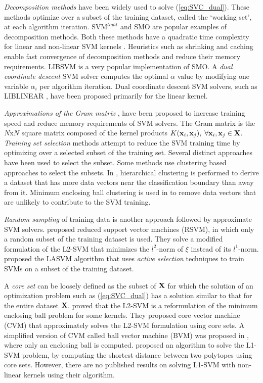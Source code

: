 \documentclass[twoside]{article}
\begin{document}
{\em Decomposition methods} \citep{Osuna97} have been widely used to solve (\ref{eq:SVC_dual}). These methods optimize over a subset of the training dataset, called the `working set', at each algorithm iteration. $\text{SVM}^{light}$ \citep{Joachims99} and SMO \citep{Platt99} are popular examples of decomposition methods. Both these methods have a quadratic time complexity for linear and non-linear SVM kernels \citep{Shalev08}. Heuristics such as shrinking and caching \citep{Joachims99} enable fast convergence of decomposition methods and reduce their memory requirements. LIBSVM \citep{LIBSVM} is a very popular implementation of SMO. A {\em dual coordinate descent} \citep{Hsieh08} SVM solver computes the optimal $\alpha$ value by modifying one variable $\alpha_i$ per algorithm iteration. Dual coordinate descent SVM solvers, such as LIBLINEAR \citep{Fan08}, have been proposed primarily for the linear kernel.

{\em Approximations of the Gram matrix} \citep{Fine02,Drineas05}, have been proposed to increase training speed and reduce memory requirements of SVM solvers. The Gram matrix is the $N$x$N$ square matrix composed of the kernel products $K({\bf x}_{i},{\bf x}_{j}),\; \forall {\bf x}_i, {\bf x}_j \in {\bf X}$. {\em Training set selection} methods attempt to reduce the SVM training time by optimizing over a selected subset of the training set. Several distinct approaches have been used to select the subset. Some methods use clustering based approaches \citep{Pavlov00} to select the subsets. In \citet{Yu03}, hierarchical clustering is performed to derive a dataset that has more data vectors near the classification boundary than away from it. Minimum enclosing ball clustering is used in \citet{Cervantes08} to remove data vectors that are unlikely to contribute to the SVM training.

{\em Random sampling} of training data is another approach followed by approximate SVM solvers. \citet{Mangasarian01} proposed reduced support vector machines (RSVM), in which only a random subset of the training dataset is used. They solve a modified formulation of the L2-SVM that  minimizes the $l^2$-norm of $\xi$ instead of its $l^1$-norm. \citet{Bordes05} proposed the LASVM algorithm that uses {\em active selection} techniques to train SVMs on a subset of the training dataset.

A {\em core set} \citep{Clarkson10} can be loosely defined as the subset of ${\bf X}$ for which the solution of an optimization problem such as (\ref{eq:SVC_dual}) has a solution similar to that for the entire dataset ${\bf X}$. \citet{Tsang05} proved that the L2-SVM is a reformulation of the minimum enclosing ball problem for some kernels. They proposed core vector machine (CVM) that approximately solves the L2-SVM formulation using core sets. A simplified version of CVM called ball vector machine (BVM) was proposed in \citet{Tsang07}, where only an enclosing ball is computed. \citet{Gartner09} proposed an algorithm to solve the L1-SVM problem, by computing the shortest distance between two polytopes \citep{Bennett00} using core sets. However, there are no published results on solving L1-SVM with non-linear kernels using their algorithm.
\end{document}
